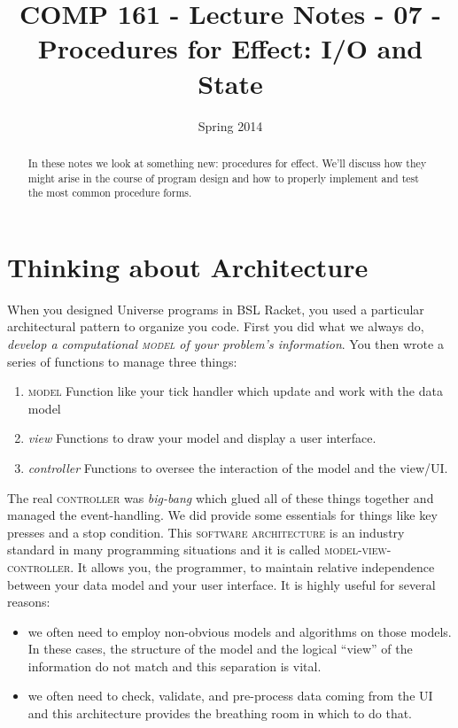 \documentclass[]{tufte-handout}
\title{COMP 161 - Lecture Notes - 07 - Procedures for Effect: I/O and State}
\date{Spring 2014}
\begin{document}
 
\maketitle

\begin{abstract}
In these notes we look at something new: procedures for effect. We'll discuss how they might arise in the course of program design and how to properly implement and test the most common procedure forms.
\end{abstract}

\section{Thinking about Architecture}

When you designed Universe programs in BSL Racket, you used a particular architectural pattern to organize you code.  First you did what we always do, \textit{develop a computational \textsc{model} of your problem's information}.  You then wrote a series of functions to manage three things:
\begin{enumerate}
\item \textsc{model} Function like your tick handler which update and work with the data model
\item \textit{view} Functions to draw your model and display a user interface.
\item \textit{controller} Functions to oversee the interaction of the model and the view/UI.
\end{enumerate}
The real \textsc{controller} was \textit{big-bang} which glued all of these things together and managed the event-handling.  We did provide some essentials for things like key presses and a stop condition. This \textsc{software architecture} is an industry standard in many programming situations and it is called \textsc{model-view-controller}.  It allows you, the programmer, to maintain relative independence between your data model and your user interface. It is highly useful for several reasons:
\begin{itemize}
\item we often need to employ non-obvious models and algorithms on those models.  In these cases, the structure of the model and the logical ``view'' of the information do not match and this separation is vital. 
\item we often need to check, validate, and pre-process data coming from the UI and this architecture provides the breathing room in which to do that. 
\end{itemize} 
\end{document}
